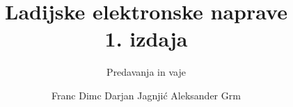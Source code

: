 \documentclass[envcountsame,envcountchap]{svmono}
\begin{document}
\author{Franc Dimc Darjan Jagnjić Aleksander Grm}
\title{Ladijske elektronske naprave\\[2mm]\Large{1. izdaja}}
\subtitle{Predavanja in vaje}
\maketitle

\frontmatter%




\tableofcontents


\mainmatter%












%










\backmatter%


\printindex

\end{document}
